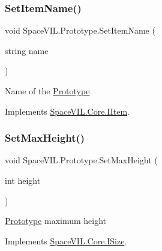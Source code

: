 \mbox{\label{class_space_v_i_l_1_1_prototype_aa4827992b9c7a63aebec49322a7b862f}} 
\subsubsection{\texorpdfstring{Set\+Item\+Name()}{SetItemName()}}
{\footnotesize\ttfamily void Space\+V\+I\+L.\+Prototype.\+Set\+Item\+Name (\begin{DoxyParamCaption}\item[{string}]{name }\end{DoxyParamCaption})\hspace{0.3cm}{\ttfamily [inline]}}



Name of the \mbox{\hyperlink{class_space_v_i_l_1_1_prototype}{Prototype}} 



Implements \mbox{\hyperlink{interface_space_v_i_l_1_1_core_1_1_i_item}{Space\+V\+I\+L.\+Core.\+I\+Item}}.

\mbox{\label{class_space_v_i_l_1_1_prototype_ae36a8ab0a4dff36218f56ae4cc9d39d4}} 
\subsubsection{\texorpdfstring{Set\+Max\+Height()}{SetMaxHeight()}}
{\footnotesize\ttfamily void Space\+V\+I\+L.\+Prototype.\+Set\+Max\+Height (\begin{DoxyParamCaption}\item[{int}]{height }\end{DoxyParamCaption})\hspace{0.3cm}{\ttfamily [inline]}}



\mbox{\hyperlink{class_space_v_i_l_1_1_prototype}{Prototype}} maximum height 



Implements \mbox{\hyperlink{interface_space_v_i_l_1_1_core_1_1_i_size}{Space\+V\+I\+L.\+Core.\+I\+Size}}.

